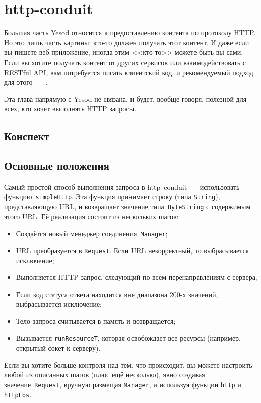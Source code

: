 \chapter{http-conduit}
Большая часть Yesod относится к предоставлению контента по протоколу
HTTP. Но это лишь часть картины: кто-то должен получать этот контент. И даже
если вы пишете веб-приложение, иногда этим <<кто-то>> можете быть вы
сами. Если вы хотите получать контент от других сервисов или
взаимодействовать с RESTful API, вам потребуется писать
клиентский код, и рекомендуемый подход для этого~---
.

Эта глава напрямую с Yesod не связана, и будет, вообще говоря, полезной для
всех, кто хочет выполнять HTTP запросы.

\section{Конспект}

\section{Основные положения}
Самый простой способ выполнения запроса в http--conduit~--- использовать
функцию~\lstinline!simpleHttp!. Эта функция принимает строку
(типа \lstinline!String!), представляющую URL, и возвращает
значение типа~\lstinline!ByteString! с содержимым этого URL. Её реализация
состоит из нескольких шагов:
\begin{itemize}
\item Создаётся новый менеджер соединения~\lstinline!Manager!;
\item URL преобразуется в \lstinline!Request!. Если URL некорректный,
  то выбрасывается исключение;
\item Выполняется HTTP запрос, следующий по всем перенаправлениям с сервера;
\item Если код статуса ответа находится вне диапазона 200-х значений,
  выбрасывается исключение;
\item Тело запроса считывается в память и возвращается;
\item Вызывается \lstinline!runResourceT!, которая освобождает все
  ресурсы (например, открытый сокет к серверу).
\end{itemize}

Если вы хотите больше контроля над тем, что происходит, вы можете
настроить любой из описанных шагов (плюс ещё несколько), явно создавая
значение~\lstinline!Request!, вручную размещая \lstinline!Manager!, и
используя функции \lstinline!http! и \lstinline!httpLbs!.

